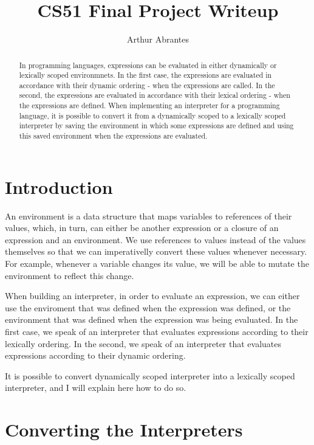 \documentclass[a4paper]{article}
\title{CS51 Final Project Writeup}
\author{Arthur Abrantes}
\begin{document}
\maketitle

\begin{abstract}
In programming languages, expressions can be evaluated in either dynamically or lexically scoped environmnets. In the first case, the expressions are evaluated in accordance with their dynamic ordering - when the expressions are called. In the second, the expressions are evaluated in accordance with their lexical ordering - when the expressions are defined. When implementing an interpreter for a programming language, it is possible to convert it from a dynamically scoped to a lexically scoped interpreter by saving the environment in which some expressions are defined and using this saved environment when the expressions are evaluated. 
\end{abstract}

\section{Introduction}

An environment is a data structure that maps variables to references of their values, which, in turn, can either be another expression or a closure of an expression and an environment. We use references to values instead of the values themselves so that we can imperativelly convert these values whenever necessary. For example, whenever a variable changes its value, we will be able to mutate the environment to reflect this change. 

When building an interpreter, in order to evaluate an expression, we can either use the enviroment that was defined when the expression was defined, or the environment that was defined when the expression was being evaluated. In the first case, we speak of an interpreter that evaluates expressions according to their lexically ordering. In the second, we speak of an interpreter that evaluates expressions according to their dynamic ordering.

It is possible to convert  dynamically scoped interpreter into a lexically scoped interpreter, and I will explain here how to do so.

\section{Converting the Interpreters}
\end{document}
